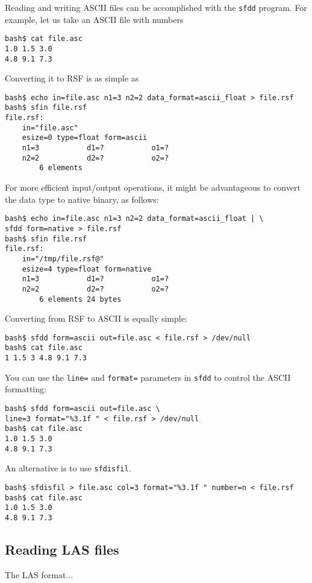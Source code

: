 Reading and writing ASCII files can be accomplished with the \texttt{sfdd}
program. For example, let us take an ASCII file with numbers
\begin{verbatim}
bash$ cat file.asc
1.0 1.5 3.0
4.8 9.1 7.3
\end{verbatim}
Converting it to RSF is as simple as
\begin{verbatim}
bash$ echo in=file.asc n1=3 n2=2 data_format=ascii_float > file.rsf
bash$ sfin file.rsf
file.rsf:
    in="file.asc"
    esize=0 type=float form=ascii
    n1=3           d1=?           o1=?
    n2=2           d2=?           o2=?
        6 elements
\end{verbatim}
For more efficient input/output operations, it might be advantageous to
convert the data type to native binary, as follows:
\begin{verbatim}
bash$ echo in=file.asc n1=3 n2=2 data_format=ascii_float | \
sfdd form=native > file.rsf
bash$ sfin file.rsf
file.rsf:
    in="/tmp/file.rsf@"
    esize=4 type=float form=native
    n1=3           d1=?           o1=?
    n2=2           d2=?           o2=?
        6 elements 24 bytes
\end{verbatim}

Converting from RSF to ASCII is equally simple:
\begin{verbatim}
bash$ sfdd form=ascii out=file.asc < file.rsf > /dev/null
bash$ cat file.asc
1 1.5 3 4.8 9.1 7.3
\end{verbatim}
You can use the \texttt{line=} and \texttt{format=} parameters in
\texttt{sfdd} to control the ASCII formatting:
\begin{verbatim}
bash$ sfdd form=ascii out=file.asc \
line=3 format="%3.1f " < file.rsf > /dev/null
bash$ cat file.asc
1.0 1.5 3.0
4.8 9.1 7.3
\end{verbatim}
An alternative is to use \texttt{sfdisfil}.
\begin{verbatim}
bash$ sfdisfil > file.asc col=3 format="%3.1f " number=n < file.rsf
bash$ cat file.asc
1.0 1.5 3.0
4.8 9.1 7.3
\end{verbatim}

\subsection{Reading LAS files}

The LAS format...



